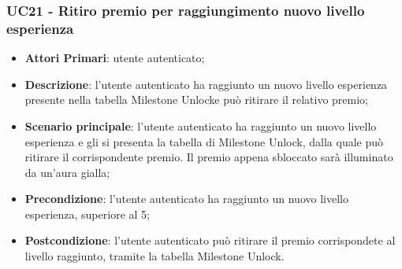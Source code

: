 \subsubsection{UC21 - Ritiro premio per raggiungimento nuovo livello esperienza}
\begin{itemize}
	\item \textbf{Attori Primari}: utente autenticato;
	\item \textbf{Descrizione}: l'utente autenticato ha raggiunto un nuovo livello esperienza presente nella tabella Milestone Unlock\glosp e può ritirare il relativo premio;	
	\item \textbf{Scenario principale}: l'utente autenticato ha raggiunto un nuovo livello esperienza e gli si presenta la tabella di Milestone Unlock, dalla quale può ritirare il corrispondente premio. Il premio appena sbloccato sarà illuminato da un'aura gialla;
	\item \textbf{Precondizione}: l'utente autenticato ha raggiunto un nuovo livello esperienza, superiore al 5;
	\item \textbf{Postcondizione}: l'utente autenticato può ritirare il premio corrispondete al livello raggiunto, tramite la tabella Milestone Unlock.
\end{itemize}
